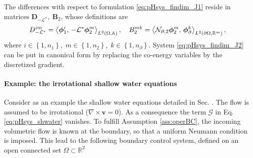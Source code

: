 The differences with respect to formulation \eqref{eq:pHsys_findim_J1} reside in matrices $\mathbf{D}_{-\mathcal{L}^*}, \; \mathbf{B}_2$, whose definitions are
\begin{equation}
{D}_{-\mathcal{L}^*}^{im} = \inner[L^2(\Omega, \mathbb{A})]{\bm\phi_1^i}{\mathcal{-L^*}\bm\phi_2^m}, \quad B_2^{mk} = \inner[L^2(\partial\Omega, \mathbb{R}^m)]{\mathcal{N}_{\partial, 2}\bm\phi_2^m}{\bm\phi_{\partial}^k},
\end{equation}
where $i \in \left\{1, n_1\right\}, \; m \in \left\{1, n_2\right\},\; k \in \left\{1, n_\partial \right\}$. System \eqref{eq:pHsys_findim_J2} can be put in canonical form by replacing the co-energy variables by the discretized gradient.

\paragraph{Example: the irrotational shallow water equations}
Consider as an example the shallow water equations detailed in Sec. .  The flow is assumed to be irrotational ($\nabla \times \bm{v} = 0$). As a consequence the term $\bm{\mathcal{G}}$ in Eq. \eqref{eq:pHsys_shwater} vanishes.
To fulfill Assumption \ref{ass:operBC}, the incoming volumetric flow is known at the boundary, so that a uniform Neumann condition is imposed. This lead to the following boundary control system, defined on an open connected set $\Omega \subset \mathbb{R}^2$

